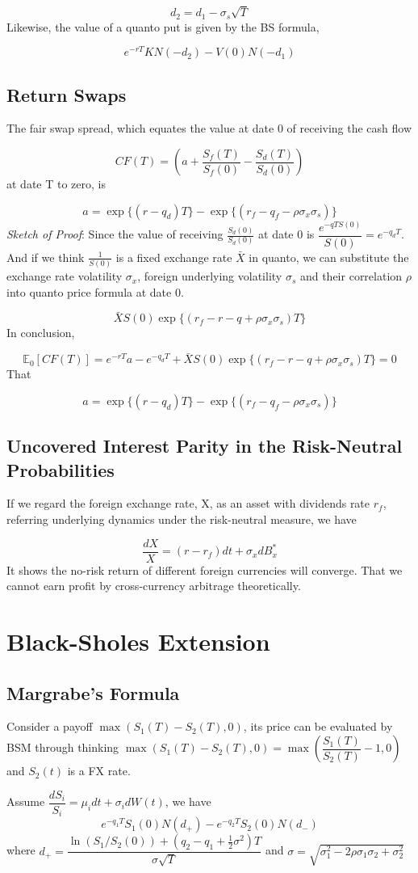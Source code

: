 \documentclass[a4]{article}
\begin{document}
$$
d_{2}=d_{1}-\sigma_{s}\sqrt{T}
$$
Likewise, the value of a quanto put is given by the BS formula,\par 
$$
e^{-rT}KN(-d_{2})-V(0)N(-d_{1})
$$
\subsection{Return Swaps}
The fair swap spread, which equates the value at date 0 of receiving the cash flow\par 
$$
CF(T) = \left(a + \frac{S_{f}(T)}{S_{f}(0)} - \frac{S_{d}(T)}{S_{d}(0)}\right)
$$
at date T to zero, is\par 
$$
a = \exp\{(r-q_{d})T\} - \exp\{(r_{f}-q_{f}-\rho \sigma_{x}\sigma_{s})\}
$$
\textsl{Sketch of Proof}: Since the value of receiving $\frac{S_{d}(0)}{S_{d}(0)}$ at date 0 is $\dfrac{e^{-qTS(0)}}{S(0)}=e^{-q_{d}T}$. And if we think $\frac{1}{S(0)}$ is a fixed exchange rate $\bar{X}$ in quanto, we can substitute the exchange rate volatility $\sigma_{x}$, foreign underlying volatility $\sigma_{s}$ and their correlation $\rho$ into quanto price formula at date 0.\par 
$$
\bar{X}S(0)\exp\{(r_{f}-r-q + \rho\sigma_{x}\sigma_{s})T\}
$$
In conclusion,\par 
$$
\mathbb{E}_{0}\left[CF(T)\right] = e^{-rT}a - e^{-q_{d}T} + \bar{X}S(0)\exp\{(r_{f}-r-q + \rho\sigma_{x}\sigma_{s})T\}=0
$$
That \par
$$
a = \exp\{(r-q_{d})T\} - \exp\{(r_{f}-q_{f}-\rho\sigma_{x}\sigma_{s})\}
$$
\subsection{Uncovered Interest Parity in the Risk-Neutral Probabilities}
If we regard the foreign exchange rate, X, as an asset with dividends rate $r_{f}$, referring underlying dynamics under the risk-neutral measure, we have\par 
$$
\dfrac{dX}{X}=(r-r_{f})dt + \sigma_{x}dB_{x}^{*}
$$
It shows the no-risk return of different foreign currencies will converge. That we cannot earn profit by cross-currency arbitrage theoretically.
\section{Black-Sholes Extension}
\subsection{Margrabe's Formula}
Consider a payoff $\max(S_{1}(T)-S_{2}(T), 0)$, its price can be evaluated by BSM through thinking  $\max(S_{1}(T)-S_{2}(T), 0) = \max(\dfrac{S_{1}(T)}{S_{2}(T)}-1, 0)$ and $S_{2}(t)$ is a FX rate.\par 
Assume $\dfrac{dS_{i}}{S_{i}}=\mu_{i}dt + \sigma_{i}dW(t)$, we have
$$
e^{-q_{1}T}S_{1}(0)N(d_{+})- e^{-q_{2}T}S_{2}(0)N(d_{-})
$$
where $d_{+} = \dfrac{\ln(S_{1}/S_{2}(0)) + (q_{2}-q_{1} + \frac{1}{2}\sigma^{2})T}{\sigma\sqrt{T} }$ and $\sigma = \sqrt{\sigma^{2}_{1}-2\rho \sigma_{1}\sigma_{2} + \sigma_{2}^{2}}$
\end{document}
